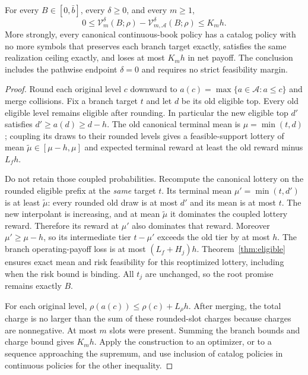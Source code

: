 \begin{theorem}\label{thm:mesh}
For every $B\in[0,\bar b]$, every $\delta\geq0$, and every $m\geq1$,
\begin{equation}\label{eq:mesh-certificate}
 0\leq\mathcal V_m^\delta(B;\rho)-\mathcal V_{m,\mathcal A}^\delta(B;\rho)
 \leq K_mh.
\end{equation}
More strongly, every canonical continuous-book policy has a catalog policy with no more symbols that preserves each branch target exactly, satisfies the same realization ceiling exactly, and loses at most $K_mh$ in net payoff. The conclusion includes the pathwise endpoint $\delta=0$ and requires no strict feasibility margin.
\end{theorem}
\begin{proof}
Round each original level $c$ downward to $a(c)=\max\{a\in\mathcal A:a\leq c\}$ and merge collisions. Fix a branch target $t$ and let $d$ be its old eligible top. Every old eligible level remains eligible after rounding. In particular the new eligible top $d'$ satisfies $d'\geq a(d)\geq d-h$. The old canonical terminal mean is $\mu=\min(t,d)$; coupling its draws to their rounded levels gives a feasible-support lottery of mean $\widetilde\mu\in[\mu-h,\mu]$ and expected terminal reward at least the old reward minus $L_fh$.

Do not retain those coupled probabilities. Recompute the canonical lottery on the rounded eligible prefix at the \emph{same} target $t$. Its terminal mean $\mu'=\min(t,d')$ is at least $\widetilde\mu$: every rounded old draw is at most $d'$ and its mean is at most $t$. The new interpolant is increasing, and at mean $\widetilde\mu$ it dominates the coupled lottery reward. Therefore its reward at $\mu'$ also dominates that reward. Moreover $\mu'\geq\mu-h$, so its intermediate tier $t-\mu'$ exceeds the old tier by at most $h$. The branch operating-payoff loss is at most $(L_f+H_j)h$. Theorem~\ref{thm:eligible} ensures exact mean and risk feasibility for this reoptimized lottery, including when the risk bound is binding. All $t_j$ are unchanged, so the root promise remains exactly $B$.

For each original level, $\rho(a(c))\leq\rho(c)+L_\rho h$. After merging, the total charge is no larger than the sum of these rounded-slot charges because charges are nonnegative. At most $m$ slots were present. Summing the branch bounds and charge bound gives $K_mh$. Apply the construction to an optimizer, or to a sequence approaching the supremum, and use inclusion of catalog policies in continuous policies for the other inequality.
\end{proof}

